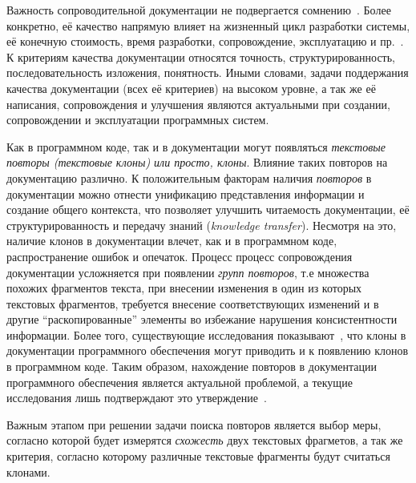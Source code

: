 Важность сопроводительной документации не подвергается сомнению~\cite{kipyegen2013importance,chomal2014significance}.
Более конкретно, её качество напрямую влияет на жизненный цикл разработки системы, её конечную стоимость, время разработки, сопровождение, эксплуатацию и пр.~\cite{plosch2014value}. 
К критериям качества документации относятся точность, структурированность, последовательность изложения, понятность.
Иными словами, задачи поддержания качества документации (всех её критериев) на высоком уровне, а так же её написания, сопровождения и улучшения являются актуальными при создании, сопровождении и эксплуатации программных систем.

Как в программном коде, так и в документации могут появляться \emph{текстовые повторы (текстовые клоны) или просто, \emph{клоны}}.
Влияние таких повторов на документацию различно.
К положительным факторам наличия \emph{повторов} в документации можно отнести унификацию представления информации и создание общего контекста, что позволяет улучшить читаемость документации, её структурированность и передачу знаний (\emph{knowledge transfer}).
Несмотря на это, наличие клонов в документации влечет, как и в программном коде,  распространение ошибок и опечаток.
Процесс процесс сопровождения документации усложняется при появлении \emph{групп повторов}, т.е множества похожих фрагментов текста, при внесении изменения в один из которых текстовых фрагментов, требуется внесение соответствующих изменений и в другие ``раскопированные'' элементы во избежание нарушения консистентности информации.
Более того, существующие исследования показывают~\cite{juergens2010can}, что клоны в документации программного обеспечения могут приводить и к появлению клонов в программном коде.
Таким образом, нахождение повторов в документации программного обеспечения является актуальной проблемой, а текущие исследования лишь подтверждают это утверждение~\cite{horie2010tool, poruban2014reusable, poruban2016preliminary, juergens2010can, oumaziz2017documentation}.

Важным этапом при решении задачи поиска повторов является выбор
меры, согласно которой будет измерятся \emph{схожесть} двух текстовых фрагметов, а так же критерия, согласно которому различные текстовые фрагменты будут считаться клонами.

